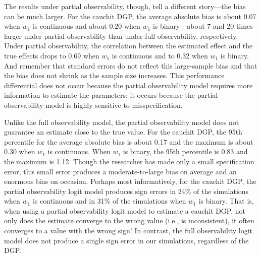 \documentclass[10pt]{article}
\begin{document}
The results under partial observability, though, tell a different story---the bias can be much larger. 
For the cauchit DGP, the average absolute bias is about 0.07 when $w_1$ is continuous and about 0.20 when $w_1$ is binary---about 7 and 20 times larger under partial observability than under full observability, respectively. 
Under partial observability, the correlation between the estimated effect and the true effects drops to 0.69 when $w_1$ is continuous and to 0.32 when $w_1$ is binary.
And remember that standard errors do not reflect this large-sample bias and that the bias does not shrink as the sample size increases. 
This performance differential does not occur because the partial observability model requires more information to estimate the parameters; it occurs because the partial observability model is highly sensitive to misspecification. 

Unlike the full observability model, the partial observability model does not guarantee an estimate close to the true value. 
For the cauchit DGP, the 95th percentile for the average absolute bias is about 0.17 and the maximum is about 0.30 when $w_1$ is continuous. When $w_1$ is binary, the 95th percentile is 0.83 and the maximum is 1.12. 
Though the researcher has made only a small specification error, this small error produces a moderate-to-large bias on average and an enormous bias on occasion. 
Perhaps most informatively, for the cauchit DGP, the partial observability logit model produces sign errors in 24\% of the simulations when $w_1$ is continuous and in 31\% of the simulations when $w_1$ is binary. 
That is, when using a partial observability logit model to estimate a cauchit DGP, not only does the estimate converge to the wrong value (i.e., is inconsistent), it often converges to a value with the wrong sign!
In contrast, the full observability logit model does not produce a single sign error in our simulations, regardless of the DGP.
\end{document}
